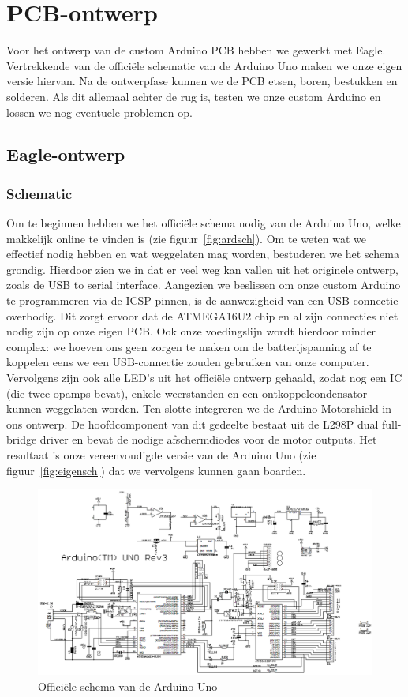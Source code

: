 \section{PCB-ontwerp}
Voor het ontwerp van de custom Arduino PCB hebben we gewerkt met Eagle. Vertrekkende van de offici\"{e}le schematic van de Arduino Uno maken we onze eigen versie hiervan. Na de ontwerpfase kunnen we de PCB etsen, boren, bestukken en solderen. Als dit allemaal achter de rug is, testen we onze custom Arduino en lossen we nog eventuele problemen op. 
\subsection{Eagle-ontwerp}
\subsubsection{Schematic}
Om te beginnen hebben we het offici\"{e}le schema nodig van de Arduino Uno, welke makkelijk online te vinden is (zie figuur~\vref{fig:ardsch}). Om te weten wat we effectief nodig hebben en wat weggelaten mag worden, bestuderen we het schema grondig. Hierdoor zien we in dat er veel weg kan vallen uit het originele ontwerp, zoals de USB to serial interface. Aangezien we beslissen om onze custom Arduino te programmeren via de ICSP-pinnen, is de aanwezigheid van een USB-connectie overbodig. Dit zorgt ervoor dat de ATMEGA16U2 chip en al zijn connecties niet nodig zijn op onze eigen PCB. Ook onze voedingslijn wordt hierdoor minder complex: we hoeven ons geen zorgen te maken om de batterijspanning af te koppelen eens we een USB-connectie zouden gebruiken van onze computer. Vervolgens zijn ook alle LED's uit het offici\"{e}le ontwerp gehaald, zodat nog een IC (die twee opamps bevat), enkele weerstanden en een ontkoppelcondensator kunnen weggelaten worden. Ten slotte integreren we de Arduino Motorshield in ons ontwerp. De hoofdcomponent van dit gedeelte bestaat uit de L298P dual full-bridge driver en bevat de nodige afschermdiodes voor de motor outputs. Het resultaat is onze vereenvoudigde versie van de Arduino Uno (zie figuur~\vref{fig:eigensch}) dat we vervolgens kunnen gaan boarden.

\begin{figure}[H]
	\centering
	\includegraphics[width=\textwidth]{arduino-uno-r3-schematic.png}
	\caption{Offici\"{e}le schema van de Arduino Uno\label{fig:ardsch}}
\end{figure}

